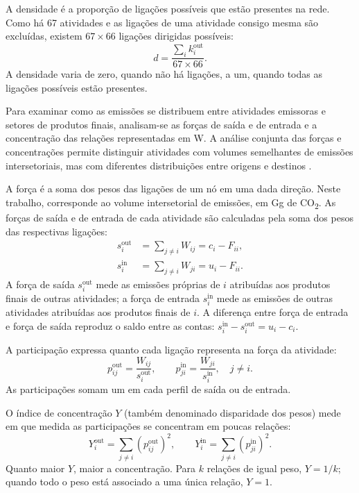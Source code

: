 A densidade é a proporção de ligações possíveis que estão presentes na rede. Como há 67 atividades e as ligações de uma atividade consigo mesma são excluídas, existem $67\times66$ ligações dirigidas possíveis:
\begin{equation}
d=\frac{\sum_i k_i^{\mathrm{out}}}{67\times66}.
\label{eq:densidade-rede}
\end{equation}
A densidade varia de zero, quando não há ligações, a um, quando todas as ligações possíveis estão presentes.

Para examinar como as emissões se distribuem entre atividades emissoras e setores de produtos finais, analisam-se as forças de saída e de entrada e a concentração das relações representadas em W. A análise conjunta das forças e concentrações permite distinguir atividades com volumes semelhantes de emissões intersetoriais, mas com diferentes distribuições entre origens e destinos \parencite{huang2019,serrano2009}.

A força é a soma dos pesos das ligações de um nó em uma dada direção. Neste trabalho, corresponde ao volume intersetorial de emissões, em Gg de CO\textsubscript{2}. As forças de saída e de entrada de cada atividade são calculadas pela soma dos pesos das respectivas ligações:
\begin{equation}
\begin{aligned}
s_i^{\mathrm{out}}&=\sum_{j\ne i}W_{ij}=c_i-F_{ii},\\
s_i^{\mathrm{in}}&=\sum_{j\ne i}W_{ji}=u_i-F_{ii}.
\end{aligned}
\label{eq:forcas-externas}
\end{equation}
A força de saída $s_i^{\mathrm{out}}$ mede as emissões próprias de $i$ atribuídas aos produtos finais de outras atividades; a força de entrada $s_i^{\mathrm{in}}$ mede as emissões de outras atividades atribuídas aos produtos finais de $i$. A diferença entre força de entrada e força de saída reproduz o saldo entre as contas: $s_i^{\mathrm{in}}-s_i^{\mathrm{out}}=u_i-c_i$.

A participação expressa quanto cada ligação representa na força da atividade:
\begin{equation}
p_{ij}^{\mathrm{out}}=\frac{W_{ij}}{s_i^{\mathrm{out}}},\qquad
p_{ji}^{\mathrm{in}}=\frac{W_{ji}}{s_i^{\mathrm{in}}},\quad j\ne i.
\label{eq:participacoes-externas}
\end{equation}
As participações somam um em cada perfil de saída ou de entrada.

O índice de concentração $Y$ (também denominado disparidade dos pesos) mede em que medida as participações se concentram em poucas relações:
\begin{equation}
Y_i^{\mathrm{out}}=\sum_{j\ne i}(p_{ij}^{\mathrm{out}})^2,\qquad
Y_i^{\mathrm{in}}=\sum_{j\ne i}(p_{ji}^{\mathrm{in}})^2.
\label{eq:disparidade}
\end{equation}
Quanto maior $Y$, maior a concentração. Para $k$ relações de igual peso, $Y=1/k$; quando todo o peso está associado a uma única relação, $Y=1$.

